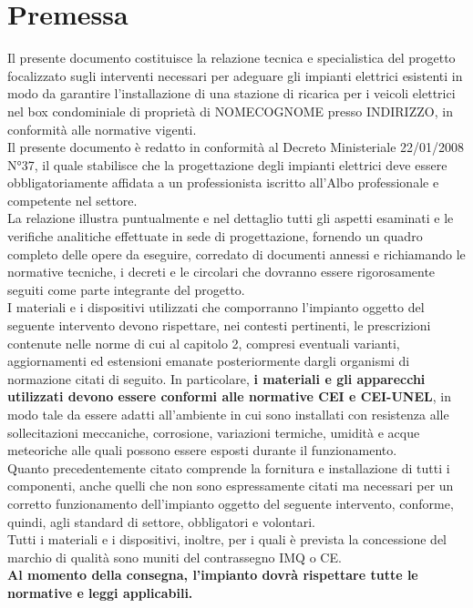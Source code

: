 \newpage
\pagestyle{fancy}

\section{Premessa}

Il presente documento costituisce la relazione tecnica e specialistica del progetto focalizzato sugli interventi necessari per adeguare gli impianti elettrici esistenti in modo da garantire l’installazione di una stazione di ricarica per i veicoli elettrici nel box condominiale di proprietà di {NOMECOGNOME} presso {INDIRIZZO}, in conformità alle normative vigenti. \\
Il presente documento è redatto in conformità al Decreto Ministeriale 22/01/2008 N°37, il quale stabilisce che la progettazione degli impianti elettrici deve essere obbligatoriamente affidata a un professionista iscritto all'Albo professionale e competente nel settore. \\
La relazione illustra puntualmente e nel dettaglio tutti gli aspetti esaminati e le verifiche analitiche effettuate in sede di progettazione, fornendo un quadro completo delle opere da eseguire, corredato di documenti annessi e richiamando le normative tecniche, i decreti e le circolari che dovranno essere rigorosamente seguiti come parte integrante del progetto. \\
I materiali e i dispositivi utilizzati che comporranno l’impianto oggetto del seguente intervento devono rispettare, nei contesti pertinenti, le prescrizioni contenute nelle norme di cui al capitolo 2, compresi eventuali varianti, aggiornamenti ed estensioni emanate posteriormente dargli organismi di normazione citati di seguito. In particolare, \textbf{i materiali e gli apparecchi utilizzati devono essere conformi alle normative CEI e CEI-UNEL}, in modo tale da essere adatti all’ambiente in cui sono installati con resistenza alle sollecitazioni meccaniche, corrosione, variazioni termiche, umidità e acque meteoriche alle quali possono essere esposti durante il funzionamento. \\
Quanto precedentemente citato comprende la fornitura e installazione di tutti i componenti, anche quelli che non sono espressamente citati ma necessari per un corretto funzionamento dell’impianto oggetto del seguente intervento, conforme, quindi, agli standard di settore, obbligatori e volontari. \\
Tutti i materiali e i dispositivi, inoltre, per i quali è prevista la concessione del marchio di qualità sono muniti del contrassegno IMQ o CE. \\
\textbf{Al momento della consegna, l’impianto dovrà rispettare tutte le normative e leggi applicabili.}



